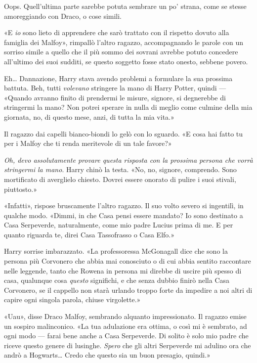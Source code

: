 Oops. Quell’ultima parte sarebbe potuta sembrare un po’ strana, come se stesse amoreggiando con Draco, o cose simili.

«E \textit{io} sono lieto di apprendere che sarò trattato con il rispetto dovuto alla famiglia dei Malfoy», rimpallò l’altro ragazzo, accompagnando le parole con un sorriso simile a quello che il più sommo dei sovrani avrebbe potuto concedere all’ultimo dei suoi sudditi, se questo soggetto fosse stato onesto, sebbene povero.

Eh… Dannazione, Harry stava avendo problemi a formulare la sua prossima battuta. Beh, tutti \textit{volevano} stringere la mano di Harry Potter, quindi — «Quando avranno finito di prendermi le misure, signore, si degnerebbe di stringermi la mano? Non potrei sperare in nulla di meglio come culmine della mia giornata, no, di questo mese, anzi, di tutta la mia vita.»

Il ragazzo dai capelli bianco-biondi lo gelò con lo sguardo. «E cosa hai fatto tu per i Malfoy che ti renda meritevole di un tale favore?»

\textit{Oh, devo assolutamente provare questa risposta con la prossima persona che vorrà stringermi la mano}. Harry chinò la testa. «No, no, signore, comprendo. Sono mortificato di averglielo chiesto. Dovrei essere onorato di pulire i suoi stivali, piuttosto.»

«Infatti», rispose bruscamente l’altro ragazzo. Il suo volto severo si ingentilì, in qualche modo. «Dimmi, in che Casa pensi essere mandato? Io sono destinato a Casa Serpeverde, naturalmente, come mio padre Lucius prima di me. E per quanto riguarda te, direi Casa Tassofrasso o Casa Elfo.»

Harry sorrise imbarazzato. «La professoressa McGonagall dice che sono la persona più Corvonero che abbia mai conosciuto o di cui abbia sentito raccontare nelle leggende, tanto che Rowena in persona mi direbbe di uscire più spesso di casa, qualunque cosa \textit{questo} significhi, e che senza dubbio finirò nella Casa Corvonero, se il cappello non starà urlando troppo forte da impedire a noi altri di capire ogni singola parola, chiuse virgolette.»

«Uau», disse Draco Malfoy, sembrando alquanto impressionato. Il ragazzo emise un sospiro malinconico. «La tua adulazione era ottima, o così mi è sembrato, ad ogni modo — farai bene anche a Casa Serpeverde. Di solito è solo mio padre che riceve questo genere di lusinghe. \textit{Spero} che gli altri Serpeverde mi adulino ora che andrò a Hogwarts… Credo che questo sia un buon presagio, quindi.»

